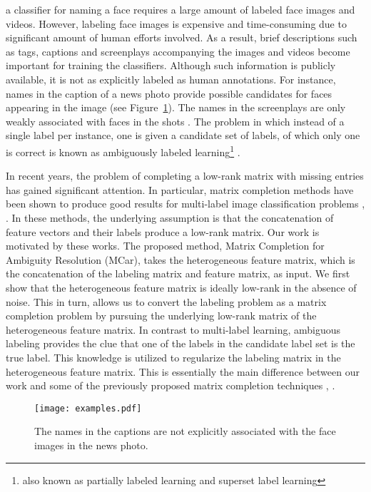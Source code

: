 \documentclass[10pt,journal,compsoc]{IEEEtran}
\begin{document}
 a classifier for naming a face requires a large amount of labeled face images and videos.  However, labeling face images is expensive and time-consuming due to significant amount of human efforts involved.  As a result, brief descriptions such as tags, captions and screenplays accompanying the images and videos become important for training the classifiers.  Although such information is publicly available, it is not as explicitly labeled as human annotations.  For instance, names in the caption of a news photo provide possible candidates for faces appearing in the image \cite{Berg2004,Berg20041} (see Figure~\ref{fig:newsphoto}).  The names in the screenplays are only weakly associated with faces in the shots \cite{Everingham2006ReID}.  The problem in which instead of a single label per instance, one is given a candidate set of labels, of which only one is correct is known as ambiguously labeled learning\footnote{also known as partially labeled learning and superset label learning} \cite{Hullermeier2006,Cour2009,Liu2012acm,Chen2013,Liu2014lot}.


In recent years, the problem of completing a low-rank matrix with missing entries has gained significant attention. In particular, matrix completion methods have been shown to produce good results for multi-label image classification problems \cite{Goldberg2010}, \cite{Cabral2011}. In these methods, the underlying assumption is that the concatenation of feature vectors and their labels produce a low-rank matrix.  Our work is motivated by these works.  The proposed method, Matrix Completion for Ambiguity Resolution (MCar), takes the heterogeneous feature matrix, which is the concatenation of the labeling matrix and feature matrix, as input. We first show that the heterogeneous feature matrix is ideally low-rank in the absence of noise.  This in turn, allows us to convert the labeling problem as a matrix completion problem by pursuing the underlying low-rank matrix of the heterogeneous feature matrix. In contrast to multi-label learning, ambiguous labeling provides the clue that one of the labels in the candidate label set is the true label. This knowledge is utilized to regularize the labeling matrix in the heterogeneous feature matrix.  This is essentially the main difference between our work and some of the previously proposed matrix completion techniques \cite{Goldberg2010}, \cite{Cabral2011}.

\begin{figure}[t]
\centering
\texttt{[image: examples.pdf]}
\caption{The names in the captions are not explicitly associated with the face images in the news photo.}
\label{fig:newsphoto}
\end{figure}
\end{document}
